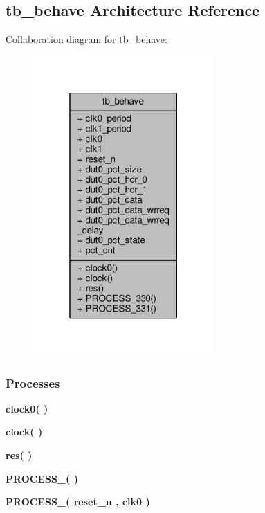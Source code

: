 \subsection{tb\+\_\+behave Architecture Reference}
\label{classdata2packets__tb_1_1tb__behave}


Collaboration diagram for tb\+\_\+behave\+:\nopagebreak
\begin{figure}[H]
\begin{center}
\leavevmode
\includegraphics[width=196pt]{d1/d74/classdata2packets__tb_1_1tb__behave__coll__graph}
\end{center}
\end{figure}
\subsubsection*{Processes}
 \begin{DoxyCompactItemize}
\item 
{\bf clock0}{\bfseries  (  )}
\item 
{\bf clock}{\bfseries  (  )}
\item 
{\bf res}{\bfseries  (  )}
\item 
{\bf P\+R\+O\+C\+E\+S\+S\+\_}{\bfseries  (  )}
\item 
{\bf P\+R\+O\+C\+E\+S\+S\+\_}{\bfseries  ( {\bfseries {\bfseries {\bf reset\+\_\+n}} \textcolor{vhdlchar}{ }} , {\bfseries {\bfseries {\bf clk0}} \textcolor{vhdlchar}{ }} )}
\end{DoxyCompactItemize}
